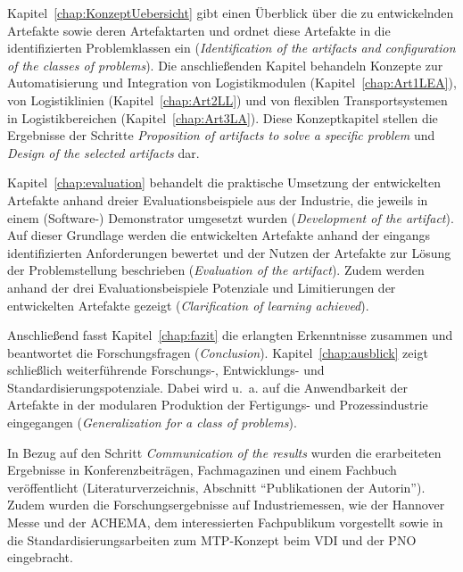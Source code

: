\pagebreak

Kapitel~\ref{chap:KonzeptUebersicht} gibt einen Überblick über die zu entwickelnden Artefakte sowie deren Artefaktarten und ordnet diese Artefakte in die identifizierten Problemklassen ein (\emph{Identification of the artifacts and configuration of the classes of problems}). Die anschließenden Kapitel behandeln Konzepte zur Automatisierung und Integration von Logistikmodulen (Kapitel~\ref{chap:Art1LEA}), von Logistiklinien (Kapitel~\ref{chap:Art2LL}) und von flexiblen Transportsystemen in Logistikbereichen (Kapitel~\ref{chap:Art3LA}). Diese Konzeptkapitel stellen die Ergebnisse der Schritte \emph{Proposition of artifacts to solve a specific problem} und \emph{Design of the selected artifacts} dar. 

Kapitel~\ref{chap:evaluation} behandelt die praktische Umsetzung der entwickelten Artefakte anhand dreier Evaluationsbeispiele aus der Industrie, die jeweils in einem (Soft\-ware-) Demonstrator umgesetzt wurden (\emph{Development of the artifact}). Auf dieser Grundlage werden die entwickelten Artefakte anhand der eingangs identifizierten Anforderungen bewertet und der Nutzen der Artefakte zur Lösung der Problemstellung beschrieben (\emph{Evaluation of the artifact}). Zudem werden anhand der drei Evaluationsbeispiele Potenziale und Limitierungen der entwickelten Artefakte gezeigt (\emph{Clarification of learning achieved}).

Anschließend fasst Kapitel~\ref{chap:fazit} die erlangten Erkenntnisse zusammen und beantwortet die Forschungsfragen (\emph{Conclusion}). Kapitel~\ref{chap:ausblick} zeigt schließlich wei\-ter\-füh\-ren\-de Forschungs-, Entwicklungs- und Standardisierungspotenziale. Dabei wird u.~a. auf die Anwendbarkeit der Artefakte in der modularen Produktion der Fer\-ti\-gungs- und Prozessindustrie eingegangen (\emph{Generalization for a class of problems}). 

In Bezug auf den Schritt \emph{Communication of the results} wurden die erarbeiteten Ergebnisse in Konferenzbeiträgen, Fachmagazinen und einem Fachbuch veröffentlicht (Literaturverzeichnis, Abschnitt \enquote{Publikationen der Autorin}). Zudem wurden die Forschungsergebnisse auf Industriemessen, wie der Hannover Messe und der ACHEMA, dem interessierten Fachpublikum vorgestellt sowie in die Standardisierungsarbeiten zum MTP-Konzept beim VDI und der PNO eingebracht.
